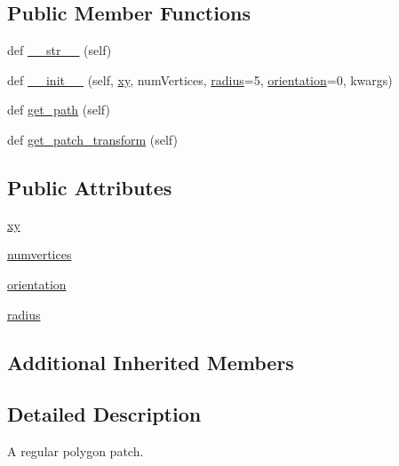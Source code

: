 \subsection*{Public Member Functions}
\begin{DoxyCompactItemize}
\item 
def \hyperlink{classmatplotlib_1_1patches_1_1RegularPolygon_ae6fdda22fbd08cabc6d4b1734ecb566b}{\+\_\+\+\_\+str\+\_\+\+\_\+} (self)
\item 
def \hyperlink{classmatplotlib_1_1patches_1_1RegularPolygon_aa770673389a6fd439d99cafe62e8f63c}{\+\_\+\+\_\+init\+\_\+\+\_\+} (self, \hyperlink{classmatplotlib_1_1patches_1_1RegularPolygon_a504bd1bf9e94da2e1b2a55bd9d6b754c}{xy}, num\+Vertices, \hyperlink{classmatplotlib_1_1patches_1_1RegularPolygon_a3231c25ddcc48b1fa87581e63a29f188}{radius}=5, \hyperlink{classmatplotlib_1_1patches_1_1RegularPolygon_a9335b71fac60a3c195ffb5f2d904ad2c}{orientation}=0, kwargs)
\item 
def \hyperlink{classmatplotlib_1_1patches_1_1RegularPolygon_a3ac88672b7f698d9a376585bc7e273b0}{get\+\_\+path} (self)
\item 
def \hyperlink{classmatplotlib_1_1patches_1_1RegularPolygon_ad628433decafb3e1123f32c8cee9a3a0}{get\+\_\+patch\+\_\+transform} (self)
\end{DoxyCompactItemize}
\subsection*{Public Attributes}
\begin{DoxyCompactItemize}
\item 
\hyperlink{classmatplotlib_1_1patches_1_1RegularPolygon_a504bd1bf9e94da2e1b2a55bd9d6b754c}{xy}
\item 
\hyperlink{classmatplotlib_1_1patches_1_1RegularPolygon_ab343f6bf3753e0ed43f0666145480307}{numvertices}
\item 
\hyperlink{classmatplotlib_1_1patches_1_1RegularPolygon_a9335b71fac60a3c195ffb5f2d904ad2c}{orientation}
\item 
\hyperlink{classmatplotlib_1_1patches_1_1RegularPolygon_a3231c25ddcc48b1fa87581e63a29f188}{radius}
\end{DoxyCompactItemize}
\subsection*{Additional Inherited Members}


\subsection{Detailed Description}
\begin{DoxyVerb}A regular polygon patch.\end{DoxyVerb}
 

